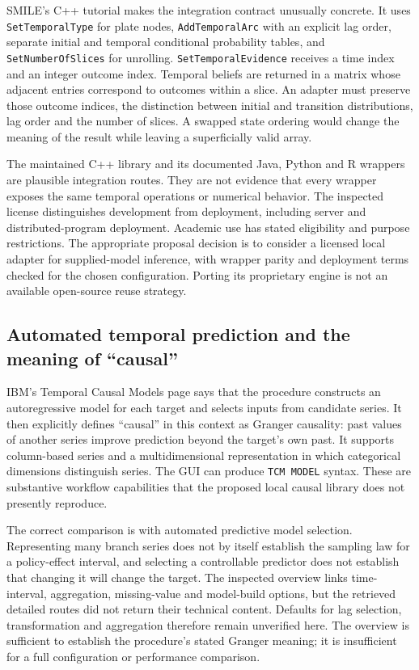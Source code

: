 SMILE's C++ tutorial makes the integration contract unusually concrete.
It uses \texttt{SetTemporalType} for plate nodes,
\texttt{AddTemporalArc} with an explicit lag order, separate initial and
temporal conditional probability tables, and \texttt{SetNumberOfSlices}
for unrolling. \texttt{SetTemporalEvidence} receives a time index and an
integer outcome index. Temporal beliefs are returned in a matrix whose
adjacent entries correspond to outcomes within a slice. An adapter must
preserve those outcome indices, the distinction between initial and
transition distributions, lag order and the number of slices. A swapped
state ordering would change the meaning of the result while leaving a
superficially valid array.\citep{exec13_ct_smile_tutorial}

The maintained C++ library and its documented Java, Python and R
wrappers are plausible integration routes. They are not evidence that
every wrapper exposes the same temporal operations or numerical
behavior. The inspected license distinguishes development from
deployment, including server and distributed-program deployment.
Academic use has stated eligibility and purpose restrictions. The
appropriate proposal decision is to consider a licensed local adapter
for supplied-model inference, with wrapper parity and deployment terms
checked for the chosen configuration. Porting its proprietary engine is
not an available open-source reuse strategy.
\citep{exec13_smile_intro,exec13_smile_license}

\hypertarget{automated-temporal-prediction-and-the-meaning-of-causal}{%
\subsection{Automated temporal prediction and the meaning of
``causal''}\label{automated-temporal-prediction-and-the-meaning-of-causal}}

IBM's Temporal Causal Models page says that the procedure constructs an
autoregressive model for each target and selects inputs from candidate
series. It then explicitly defines ``causal'' in this context as Granger
causality: past values of another series improve prediction beyond the
target's own past. It supports column-based series and a
multidimensional representation in which categorical dimensions
distinguish series. The GUI can produce \texttt{TCM\ MODEL} syntax.
These are substantive workflow capabilities that the proposed local
causal library does not presently reproduce. \citep{exec13_ct_ibm_tcm}

The correct comparison is with automated predictive model selection.
Representing many branch series does not by itself establish the
sampling law for a policy-effect interval, and selecting a controllable
predictor does not establish that changing it will change the target.
The inspected overview links time-interval, aggregation, missing-value
and model-build options, but the retrieved detailed routes did not
return their technical content. Defaults for lag selection,
transformation and aggregation therefore remain unverified here. The
overview is sufficient to establish the procedure's stated Granger
meaning; it is insufficient for a full configuration or performance
comparison.

